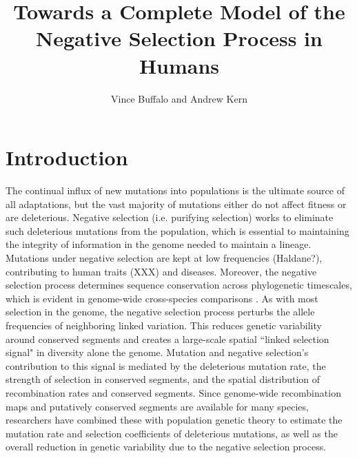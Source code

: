 \documentclass[11pt]{article}
\title{Towards a Complete Model of the Negative Selection Process in Humans}
\author{Vince Buffalo and Andrew Kern}
\begin{document}
\maketitle



\begin{abstract} 
\end{abstract}


\section*{Introduction}

The continual influx of new mutations into populations is the ultimate source
of all adaptations, but the vast majority of mutations either do not affect
fitness or are deleterious. Negative selection (i.e. purifying selection) works
to eliminate such deleterious mutations from the population, which is essential
to maintaining the integrity of information in the genome needed to maintain a
lineage. Mutations under negative selection are kept at low frequencies
(Haldane?), contributing to human traits (XXX) and diseases. Moreover, the
negative selection process determines sequence conservation across phylogenetic
timescales, which is evident in genome-wide cross-species comparisons
\parencite{Siepel2005-wh}. As with most selection in the genome, the negative
selection process perturbs the allele frequencies of neighboring linked
variation. This reduces genetic variability around conserved segments and
creates a large-scale spatial ``linked selection signal" in diversity alone the
genome. Mutation and negative selection's contribution to this signal is
mediated by the deleterious mutation rate, the strength of selection in
conserved segments, and the spatial distribution of recombination rates and
conserved segments. Since genome-wide recombination maps and putatively
conserved segments are available for many species, researchers have combined
these with population genetic theory to estimate the mutation rate and
selection coefficients of deleterious mutations, as well as the overall
reduction in genetic variability due to the negative selection process.
\end{document}
